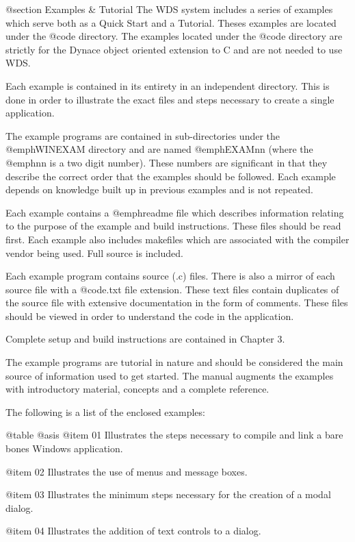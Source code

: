 @section Examples & Tutorial
The WDS system includes a series of examples which serve both as a Quick
Start and a Tutorial.  Theses examples are located under the
@code{\DYNACE\WINEXAM} directory.  The examples located under the
@code{\DYNACE\EXAMPLES} directory are strictly for the Dynace object
oriented extension to C and are not needed to use WDS.

Each example is contained in its entirety in an independent directory.
This is done in order to illustrate the exact files and steps necessary
to create a single application.

The example programs are contained in sub-directories under the
@emph{WINEXAM} directory and are named @emph{EXAMnn} (where the
@emph{nn} is a two digit number).  These numbers are significant in that
they describe the correct order that the examples should be followed.
Each example depends on knowledge built up in previous examples and is
not repeated.

Each example contains a @emph{readme} file which describes information
relating to the purpose of the example and build instructions.  These
files should be read first.  Each example also includes makefiles which
are associated with the compiler vendor being used.  Full source is
included.

Each example program contains source (.c) files.  There is also a mirror
of each source file with a @code{.txt} file extension.  These text files
contain duplicates of the source file with extensive documentation in
the form of comments.  These files should be viewed in order to
understand the code in the application.

Complete setup and build instructions are contained in Chapter 3.

The example programs are tutorial in nature and should be considered the
main source of information used to get started.  The manual augments the
examples with introductory material, concepts and a complete reference.

The following is a list of the enclosed examples:

@table @asis
@item 01
Illustrates the steps necessary to compile and link a bare bones
Windows application.

@item 02
Illustrates the use of menus and message boxes.

@item 03
Illustrates the minimum steps necessary for the creation of a modal dialog.

@item 04
Illustrates the addition of text controls to a dialog.

